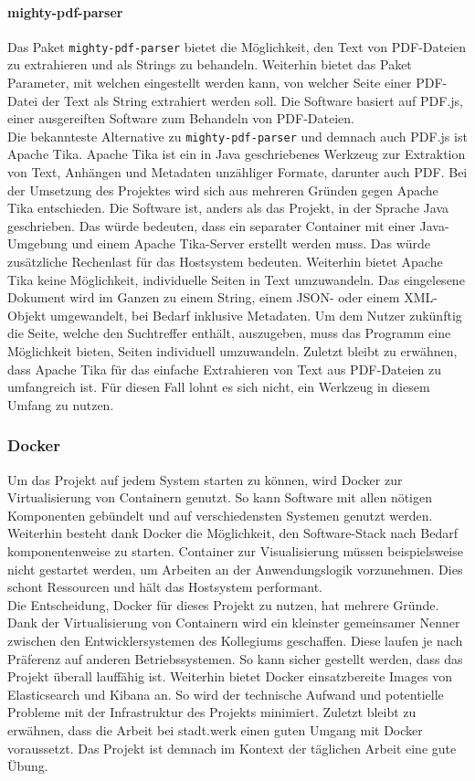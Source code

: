 \documentclass[a4paper]{scrartcl}
\begin{document}
\paragraph{mighty-pdf-parser}
Das Paket \texttt{mighty-pdf-parser} bietet die Möglichkeit, den Text von PDF-Dateien zu extrahieren und als Strings zu behandeln. Weiterhin bietet das Paket Parameter, mit welchen eingestellt werden kann, von welcher Seite einer PDF-Datei der Text als String extrahiert werden soll. Die Software basiert auf PDF.js, einer ausgereiften Software zum Behandeln von PDF-Dateien. \\
Die bekannteste Alternative zu \texttt{mighty-pdf-parser} und demnach auch PDF.js ist Apache Tika. Apache Tika ist ein in Java geschriebenes Werkzeug zur Extraktion von Text, Anhängen und Metadaten unzähliger Formate, darunter auch PDF. Bei der Umsetzung des Projektes wird sich aus mehreren Gründen gegen Apache Tika entschieden. Die Software ist, anders als das Projekt, in der Sprache Java geschrieben. Das würde bedeuten, dass ein separater Container mit einer Java-Umgebung und einem Apache Tika-Server erstellt werden muss. Das würde zusätzliche Rechenlast für das Hostsystem bedeuten. Weiterhin bietet Apache Tika keine Möglichkeit, individuelle Seiten in Text umzuwandeln. Das eingelesene Dokument wird im Ganzen zu einem String, einem JSON- oder einem XML-Objekt umgewandelt, bei Bedarf inklusive Metadaten. Um dem Nutzer zukünftig die Seite, welche den Suchtreffer enthält, auszugeben, muss das Programm eine Möglichkeit bieten, Seiten individuell umzuwandeln. Zuletzt bleibt zu erwähnen, dass Apache Tika für das einfache Extrahieren von Text aus PDF-Dateien zu umfangreich ist. Für diesen Fall lohnt es sich nicht, ein Werkzeug in diesem Umfang zu nutzen.

\subsubsection{Docker}
Um das Projekt auf jedem System starten zu können, wird Docker zur Virtualisierung von Containern genutzt. So kann Software mit allen nötigen Komponenten gebündelt und auf verschiedensten Systemen genutzt werden. Weiterhin besteht dank Docker die Möglichkeit, den Software-Stack nach Bedarf komponentenweise zu starten. Container zur Visualisierung müssen beispielsweise nicht gestartet werden, um Arbeiten an der Anwendungslogik vorzunehmen. Dies schont Ressourcen und hält das Hostsystem performant. \\
Die Entscheidung, Docker für dieses Projekt zu nutzen, hat mehrere Gründe. Dank der Virtualisierung von Containern wird ein kleinster gemeinsamer Nenner zwischen den Entwicklersystemen des Kollegiums geschaffen. Diese laufen je nach Präferenz auf anderen Betriebssystemen. So kann sicher gestellt werden, dass das Projekt überall lauffähig ist. Weiterhin bietet Docker einsatzbereite Images von Elasticsearch und Kibana an. So wird der technische Aufwand und potentielle Probleme mit der Infrastruktur des Projekts minimiert. Zuletzt bleibt zu erwähnen, dass die Arbeit bei stadt.werk einen guten Umgang mit Docker voraussetzt. Das Projekt ist demnach im Kontext der täglichen Arbeit eine gute Übung. \\
\end{document}
